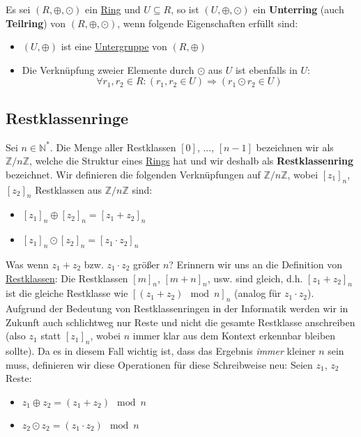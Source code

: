 \documentclass[../../main.tex]{subfiles}
\begin{document}
		\begin{definition}
			\label{def:Unterring}
			Es sei $(R,\oplus,\odot)$ ein \hyperref[def:Ring]{Ring} und $U \subseteq R$, so ist $(U,\oplus,\odot)$ ein \textbf{Unterring} (auch \textbf{Teilring}) von $(R,\oplus,\odot)$, wenn folgende Eigenschaften erfüllt sind:  
			\begin{itemize}
				\item $(U,\oplus)$ ist eine \hyperref[def:Untergruppe]{Untergruppe} von $(R,\oplus)$
				\item Die Verknüpfung zweier Elemente durch $\odot$ aus $U$ ist ebenfalls in $U$: $$\forall r_1,r_2 \in R: (r_1, r_2 \in U) \Rightarrow (r_1 \odot r_2 \in U)$$
			\end{itemize}
		\end{definition}
	
		\subsection{Restklassenringe}
		\begin{definition}[Restklassenring]
			\label{def:Restklassenring}
			Sei $n \in \mathbb{N}^*$. Die Menge aller Restklassen $[0]$, ..., $[n-1]$ bezeichnen wir als $\mathbb{Z}/n\mathbb{Z}$, welche die Struktur eines \hyperref[def:Ring]{Rings} hat und wir deshalb als \textbf{Restklassenring} bezeichnet. Wir definieren die folgenden Verknüpfungen auf $\mathbb{Z}/n\mathbb{Z}$, wobei $[z_1]_n$, $[z_2]_n$ Restklassen aus $\mathbb{Z}/n\mathbb{Z}$ sind: 
			\begin{itemize}
				\item $[z_1]_n \oplus [z_2]_n = [z_1 + z_2]_n$
				\item $[z_1]_n \odot [z_2]_n = [z_1 \cdot z_2]_n$
			\end{itemize}
			Was wenn $z_1+z_2$ bzw. $z_1 \cdot z_2$ größer $n$? Erinnern wir uns an die Definition von \hyperref[def:Restklasse]{Restklassen}: Die Restklassen $[m]_n$, $[m+n]_n$, usw. sind gleich, d.h. $[z_1 + z_2]_n$ ist die gleiche Restklasse wie $[(z_1 + z_2) \mod n]_n$ (analog für $z_1 \cdot z_2$). \\
			
			Aufgrund der Bedeutung von Restklassenringen in der Informatik werden wir in Zukunft auch schlichtweg nur Reste und nicht die gesamte Restklasse anschreiben (also $z_1$ statt $[z_1]_n$, wobei $n$ immer klar aus dem Kontext erkennbar bleiben sollte). Da es in diesem Fall wichtig ist, dass das Ergebnis \textit{immer} kleiner $n$ sein muss, definieren wir diese Operationen für diese Schreibweise neu: Seien $z_1$, $z_2$ Reste:
			\begin{itemize}
				\item $z_1 \oplus z_2 = (z_1 + z_2) \mod n$
				\item $z_2 \odot z_2 = (z_1 \cdot z_2) \mod n$
			\end{itemize}
		\end{definition}
	
\end{document}
